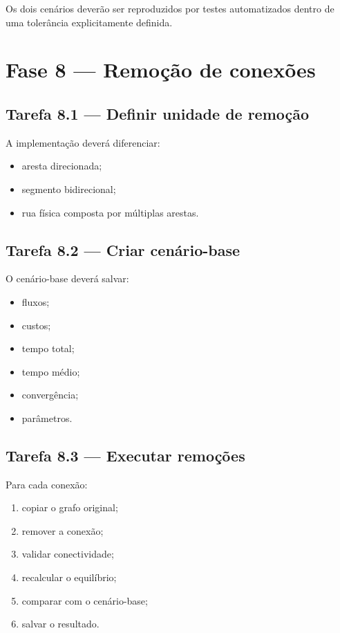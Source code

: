 \documentclass[12pt,a4paper]{article}
\begin{document}
Os dois cenários deverão ser reproduzidos por testes automatizados dentro de
uma tolerância explicitamente definida.

\section{Fase 8 --- Remoção de conexões}

\subsection{Tarefa 8.1 --- Definir unidade de remoção}

A implementação deverá diferenciar:

\begin{itemize}
    \item aresta direcionada;
    \item segmento bidirecional;
    \item rua física composta por múltiplas arestas.
\end{itemize}

\subsection{Tarefa 8.2 --- Criar cenário-base}

O cenário-base deverá salvar:

\begin{itemize}
    \item fluxos;
    \item custos;
    \item tempo total;
    \item tempo médio;
    \item convergência;
    \item parâmetros.
\end{itemize}

\subsection{Tarefa 8.3 --- Executar remoções}

Para cada conexão:

\begin{enumerate}
    \item copiar o grafo original;
    \item remover a conexão;
    \item validar conectividade;
    \item recalcular o equilíbrio;
    \item comparar com o cenário-base;
    \item salvar o resultado.
\end{enumerate}
\end{document}
